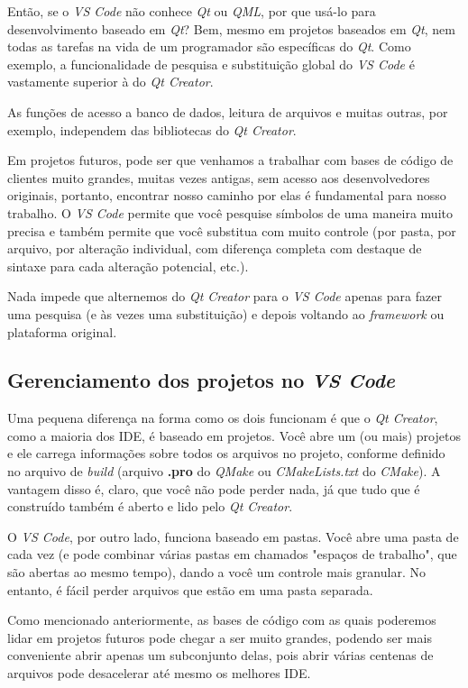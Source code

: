 \documentclass[a4paper,11pt]{article}
\newcommand{\cmake}{\textit{CMake}}
\newcommand{\build}{\textit{build}}
\newcommand{\qtcreator}{\textit{Qt Creator}}
\newcommand{\qt}{\textit{Qt}}
\newcommand{\vscode}{\textit{VS Code}}
\begin{document}
Então, se o \vscode{} não conhece \qt{} ou \textit{QML}, por que usá-lo para desenvolvimento baseado em \qt{}? Bem, mesmo em projetos baseados em \qt{}, nem todas as tarefas na vida de um programador são específicas do \qt{}. Como exemplo, a funcionalidade de pesquisa e substituição global do \vscode{} é vastamente superior à do \qtcreator{}.

As funções de acesso a banco de dados, leitura de arquivos e muitas outras, por exemplo, independem das bibliotecas do \qtcreator{}.

Em projetos futuros, pode ser que venhamos a trabalhar com bases de código de clientes muito grandes, muitas vezes antigas, sem acesso aos desenvolvedores originais, portanto, encontrar nosso caminho por elas é fundamental para nosso trabalho. O \vscode{} permite que você pesquise símbolos de uma maneira muito precisa e também permite que você substitua com muito controle (por pasta, por arquivo, por alteração individual, com diferença completa com destaque de sintaxe para cada alteração potencial, etc.).

Nada impede que alternemos do \qtcreator{} para o \vscode{} apenas para fazer uma pesquisa (e às vezes uma substituição) e depois voltando ao \textit{framework} ou plataforma original.

\subsection{Gerenciamento dos projetos no \vscode{}}

Uma pequena diferença na forma como os dois funcionam é que o \qtcreator{}, como a maioria dos IDE, é baseado em projetos. Você abre um (ou mais) projetos e ele carrega informações sobre todos os arquivos no projeto, conforme definido no arquivo de \build{} (arquivo \textbf{.pro} do \textit{QMake} ou \textit{CMakeLists.txt} do \cmake{}). A vantagem disso é, claro, que você não pode perder nada, já que tudo que é construído também é aberto e lido pelo \qtcreator{}.

O \vscode{}, por outro lado, funciona baseado em pastas. Você abre uma pasta de cada vez (e pode combinar várias pastas em chamados "espaços de trabalho", que são abertas ao mesmo tempo), dando a você um controle mais granular. No entanto, é fácil perder arquivos que estão em uma pasta separada.

Como mencionado anteriormente, as bases de código com as quais poderemos lidar em projetos futuros pode chegar a ser muito grandes, podendo ser mais conveniente abrir apenas um subconjunto delas, pois abrir várias centenas de arquivos pode desacelerar até mesmo os melhores IDE.
\end{document}

